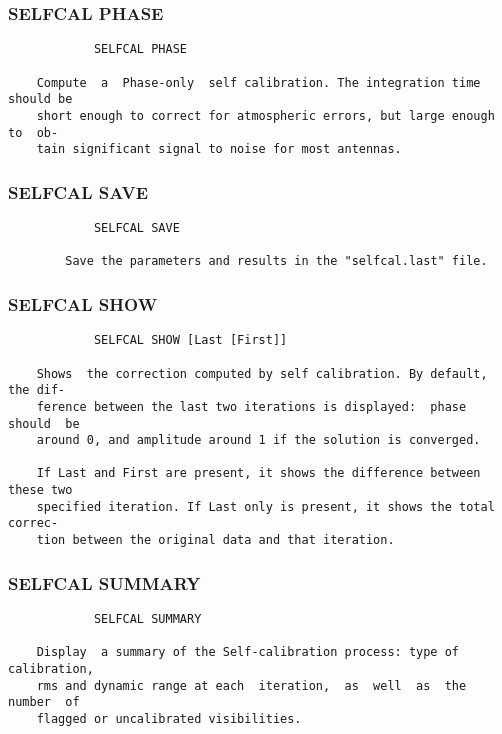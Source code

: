 \subsubsection{SELFCAL PHASE}
\begin{verbatim}
            SELFCAL PHASE

    Compute  a  Phase-only  self calibration. The integration time should be
    short enough to correct for atmospheric errors, but large enough to  ob-
    tain significant signal to noise for most antennas.

\end{verbatim}
\subsubsection{SELFCAL SAVE}
\begin{verbatim}
            SELFCAL SAVE

        Save the parameters and results in the "selfcal.last" file.

\end{verbatim}
\subsubsection{SELFCAL SHOW}
\begin{verbatim}
            SELFCAL SHOW [Last [First]]

    Shows  the correction computed by self calibration. By default, the dif-
    ference between the last two iterations is displayed:  phase  should  be
    around 0, and amplitude around 1 if the solution is converged.

    If Last and First are present, it shows the difference between these two
    specified iteration. If Last only is present, it shows the total correc-
    tion between the original data and that iteration.

\end{verbatim}
\subsubsection{SELFCAL SUMMARY}
\begin{verbatim}
            SELFCAL SUMMARY

    Display  a summary of the Self-calibration process: type of calibration,
    rms and dynamic range at each  iteration,  as  well  as  the  number  of
    flagged or uncalibrated visibilities.

\end{verbatim}
